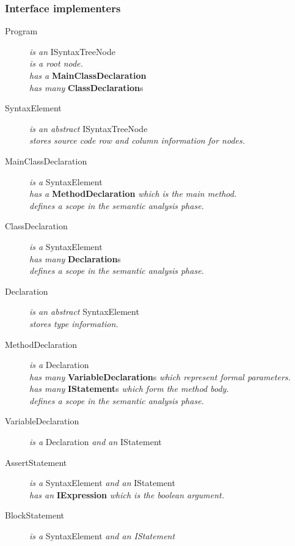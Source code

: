 \documentclass[a4paper,11pt]{article}
\begin{document}
\subsubsection{Interface implementers}
\begin{description}
\item[Program] \emph{is an} ISyntaxTreeNode \\
\emph{is a root node.} \\
\emph{has a} \textbf{MainClassDeclaration} \\
\emph{has many} \textbf{ClassDeclaration}s
\\
\item[SyntaxElement] \emph{is an abstract} ISyntaxTreeNode \\
\emph{stores source code row and column information for nodes.}
\\
\item[MainClassDeclaration] \emph{is a} SyntaxElement \\
\emph{has a} \textbf{MethodDeclaration} \emph{which is the main method.} \\
\emph{defines a scope in the semantic analysis phase.}
\item[ClassDeclaration] \emph{is a} SyntaxElement \\
\emph{has many} \textbf{Declaration}s \\
\emph{defines a scope in the semantic analysis phase.}
\\
\item[Declaration] \emph{is an abstract} SyntaxElement \\
\emph{stores type information.}
\item[MethodDeclaration] \emph{is a} Declaration \\
\emph{has many} \textbf{VariableDeclaration}s \emph{which represent formal parameters.} \\
\emph{has many} \textbf{IStatement}s \emph{which form the method body.} \\
\emph{defines a scope in the semantic analysis phase.}
\item[VariableDeclaration] \emph{is a} Declaration \emph{and an} IStatement
\\
\item[AssertStatement] \emph{is a} SyntaxElement \emph{and an} IStatement \\
\emph{has an} \textbf{IExpression} \emph{which is the boolean argument.}
\item[BlockStatement] \emph{is a} SyntaxElement \emph{and an IStatement} \\

\end{description}
\end{document}
